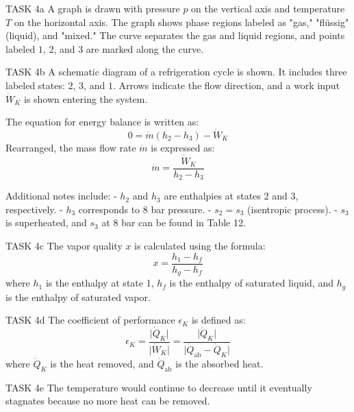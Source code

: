 TASK 4a  
A graph is drawn with pressure \( p \) on the vertical axis and temperature \( T \) on the horizontal axis. The graph shows phase regions labeled as "gas," "flüssig" (liquid), and "mixed." The curve separates the gas and liquid regions, and points labeled \( 1 \), \( 2 \), and \( 3 \) are marked along the curve.  

TASK 4b  
A schematic diagram of a refrigeration cycle is shown. It includes three labeled states: \( 2 \), \( 3 \), and \( 1 \). Arrows indicate the flow direction, and a work input \( \dot{W}_K \) is shown entering the system.  

The equation for energy balance is written as:  
\[
0 = \dot{m} (h_2 - h_3) - \dot{W}_K
\]  
Rearranged, the mass flow rate \( \dot{m} \) is expressed as:  
\[
\dot{m} = \frac{\dot{W}_K}{h_2 - h_3}
\]  

Additional notes include:  
- \( h_2 \) and \( h_3 \) are enthalpies at states 2 and 3, respectively.  
- \( h_3 \) corresponds to 8 bar pressure.  
- \( s_2 = s_3 \) (isentropic process).  
- \( s_3 \) is superheated, and \( s_3 \) at 8 bar can be found in Table 12.  

TASK 4c  
The vapor quality \( x \) is calculated using the formula:  
\[
x = \frac{h_1 - h_f}{h_g - h_f}
\]  
where \( h_1 \) is the enthalpy at state 1, \( h_f \) is the enthalpy of saturated liquid, and \( h_g \) is the enthalpy of saturated vapor.  

TASK 4d  
The coefficient of performance \( \epsilon_K \) is defined as:  
\[
\epsilon_K = \frac{\lvert \dot{Q}_K \rvert}{\lvert \dot{W}_K \rvert} = \frac{\lvert \dot{Q}_K \rvert}{\lvert \dot{Q}_{\text{ab}} - \dot{Q}_K \rvert}
\]  
where \( \dot{Q}_K \) is the heat removed, and \( \dot{Q}_{\text{ab}} \) is the absorbed heat.  

TASK 4e  
The temperature would continue to decrease until it eventually stagnates because no more heat can be removed.